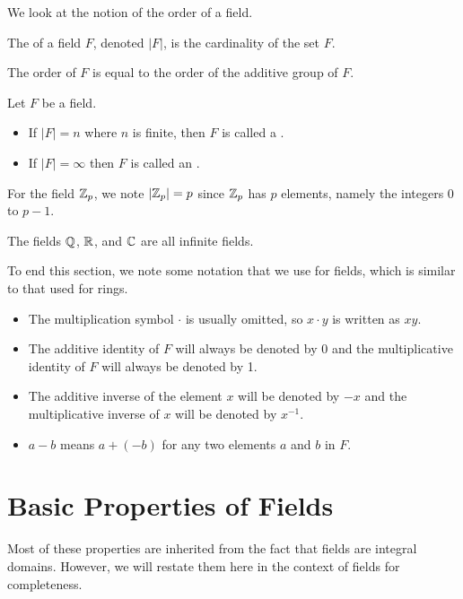 We look at the notion of the order of a field.
\begin{definition}
    The  of a field $F$, denoted $|F|$, is the cardinality of the set $F$.
\end{definition}
\begin{remark}
    The order of $F$ is equal to the order of the additive group of $F$.
\end{remark}

\begin{definition}
    Let $F$ be a field.
    \begin{itemize}
        \item If $|F| = n$ where $n$ is finite, then $F$ is called a .
        \item If $|F| = \infty$ then $F$ is called an .
    \end{itemize}
\end{definition}

\begin{example}
    For the field $\mathbb{Z}_p$, we note $|\mathbb{Z}_p| = p$ since $\mathbb{Z}_p$ has $p$ elements, namely the integers 0 to $p - 1$.
\end{example}
\begin{example}
    The fields $\mathbb{Q}$, $\mathbb{R}$, and $\mathbb{C}$ are all infinite fields.
\end{example}

To end this section, we note some notation that we use for fields, which is similar to that used for rings.
\begin{itemize}
    \item The multiplication symbol $\cdot$ is usually omitted, so $x \cdot y$ is written as $xy$.
    \item The additive identity of $F$ will always be denoted by 0 and the multiplicative identity of $F$ will always be denoted by 1.
    \item The additive inverse of the element $x$ will be denoted by $-x$ and the multiplicative inverse of $x$ will be denoted by $x^{-1}$.
    \item $a - b$ means $a + (-b)$ for any two elements $a$ and $b$ in $F$.
\end{itemize}

\section{Basic Properties of Fields}
Most of these properties are inherited from the fact that fields are integral domains. However, we will restate them here in the context of fields for completeness.

